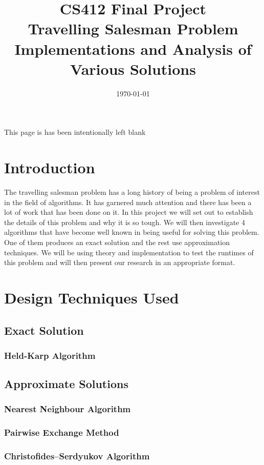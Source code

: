 \documentclass[12pt]{article}
\title
{%
  {CS412 Final Project \\
  \large Travelling Salesman Problem\\
    Implementations and Analysis of Various Solutions}
}
\date{\today}
\begin{document}
\maketitle
\newpage

\par \centering
This page is has been intentionally left blank
\par \flushleft

\newpage
\tableofcontents

\newpage


\newpage
\section{Introduction}
The travelling salesman problem has a long history of being a problem of interest in the field of algorithms. It has garnered much attention and there has been a lot of work that has been done on it. In this project we will set out to establish the details of this problem and why it is so tough. We will then investigate 4 algorithms that have become well known in being useful for solving this problem. One of them produces an exact solution and the rest use approximation techniques. We will be using theory and implementation to test the runtimes of this problem and will then present our research in an appropriate format.
\section{Design Techniques Used}
	\subsection{Exact Solution}
		\subsubsection{ Held-Karp Algorithm}
	\subsection{ Approximate Solutions}
		\subsubsection {Nearest Neighbour Algorithm}
		\subsubsection {Pairwise Exchange Method}
		\subsubsection {Christofides–Serdyukov Algorithm}
\end{document}
